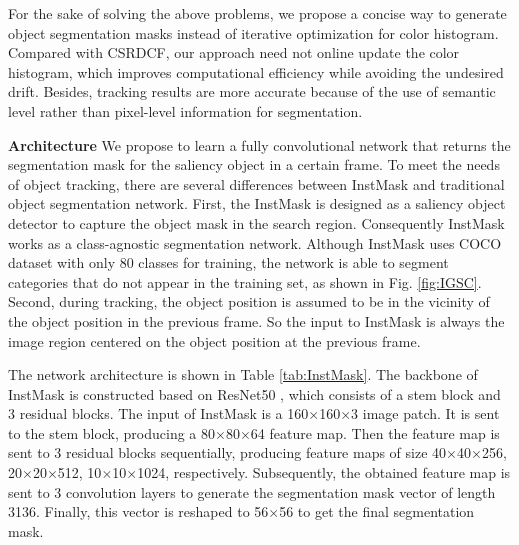 \documentclass[review]{elsarticle}
\begin{document}
For the sake of solving the above problems, we propose a concise way to generate object segmentation masks instead of iterative optimization for color histogram. Compared with CSRDCF, our approach need not  online update the color histogram, which improves computational efficiency while avoiding the undesired drift. Besides, tracking results are more accurate because of the use of semantic level rather than pixel-level information for segmentation.

\textbf{Architecture} We propose to learn a fully convolutional network that returns the segmentation mask for the saliency object in a certain frame. To meet the needs of object tracking, there are several differences between InstMask and traditional object segmentation network. First, the InstMask is designed as a saliency object detector to capture the object mask in the search region. Consequently InstMask works as a class-agnostic segmentation network. Although InstMask uses COCO dataset \cite{Lin2014MicrosoftCC} with only 80 classes for training, the network is able to segment categories that do not appear in the training set, as shown in Fig. \ref{fig:IGSC}. Second, during tracking, the object position is assumed to be in the vicinity of the object position in the previous frame. So the input to InstMask is always the image region centered on the object position at the previous frame.

The network architecture is shown in Table \ref{tab:InstMask}. The backbone of InstMask is constructed based on ResNet50 \cite{He2016DeepRL}, which consists of a stem block and 3 residual blocks.
The input of InstMask is a 160$\times$160$\times$3 image patch. It is sent to the stem block, producing a 80$\times$80$\times$64 feature map. Then the feature map is sent to 3 residual blocks sequentially, producing feature maps of size 40$\times$40$\times$256, 20$\times$20$\times$512, 10$\times$10$\times$1024, respectively. Subsequently, the obtained feature map is sent to 3 convolution layers to generate the segmentation mask vector of length 3136. Finally, this vector is reshaped to 56$\times$56 to get the final segmentation mask.
\end{document}
